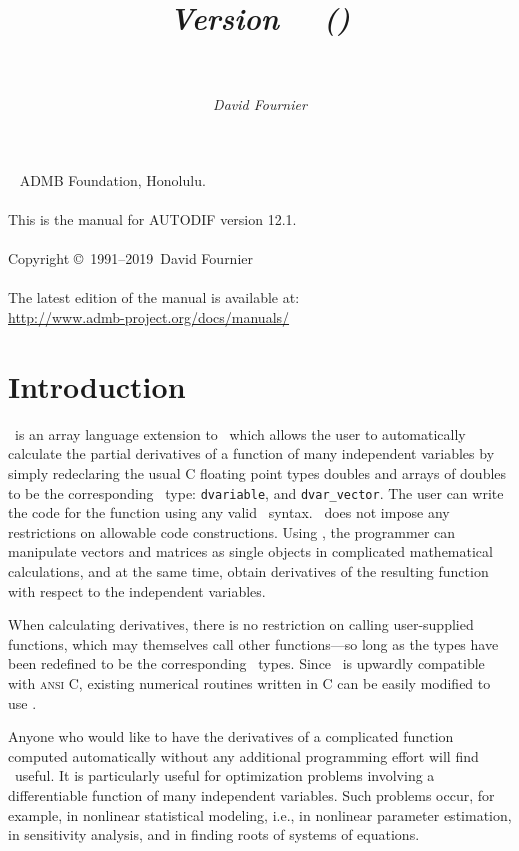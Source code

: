 \documentclass{admbmanual}
\title{%
  \largetitlepart{AUTODIF}
  \smalltitlepart{%
    A \cplus\ Array Language Extension\\
    with Automatic Differentiation\\
    for Use in Nonlinear Modeling and Statistics}
  \vspace{4ex}\textsf{\textit{Version \admbversion~~(\admbdate)\\[3pt]
      ~%
    }}\vspace{3ex}
}
\author{\textsf{\textit{David Fournier}}}
\newcommand\admbversion{12.1}
\newcommand\admbyear{2019}
\newcommand{\question}[1]{\bigskip\noindent{\bf #1?}\par\medskip\noindent}
\begin{document}
\maketitle

~\vfill
\noindent ADMB Foundation, Honolulu.\\\\
\noindent This is the manual for AUTODIF version \admbversion.\\\\
\noindent Copyright \copyright\ 1991--\admbyear\ David Fournier\\\\
\noindent The latest edition of the manual is available at:\\
\url{http://www.admb-project.org/docs/manuals/}

\tableofcontents

\chapter{Introduction}
\label{ch:introduction}

\question{What is \scAD}
\scAD\ is an array language extension to \cplus\ which allows the user to
automatically calculate the partial derivatives of a function of many
independent variables by simply redeclaring the usual C floating point types
doubles and arrays of doubles to be the corresponding \scAD\ type:
\texttt{dvariable}, and \texttt{dvar\_vector}. The user can write the code for
the function using any valid \cplus\ syntax. \scAD\ does not impose any
restrictions on allowable code constructions. Using \scAD, the programmer can
manipulate vectors and matrices as single objects in complicated mathematical
calculations, and at the same time, obtain derivatives of the resulting function
with respect to the independent variables.

When calculating derivatives, there is no restriction on calling user-supplied
functions, which may themselves call other functions---so long as the types have
been redefined to be the corresponding \scAD\ types. Since \cplus\ is upwardly
compatible with \textsc{ansi C}, existing numerical routines written in C can be
easily modified to use \scAD.

\question{Who should use \scAD}
Anyone who would like to have the derivatives of a complicated function computed
automatically without any additional programming effort will find \scAD\ useful.
It is particularly useful for optimization problems involving a differentiable
function of many independent variables. Such problems occur, for example, in
nonlinear statistical modeling, i.e., in nonlinear parameter estimation, in
sensitivity analysis, and in finding roots of systems of equations.
\end{document}
